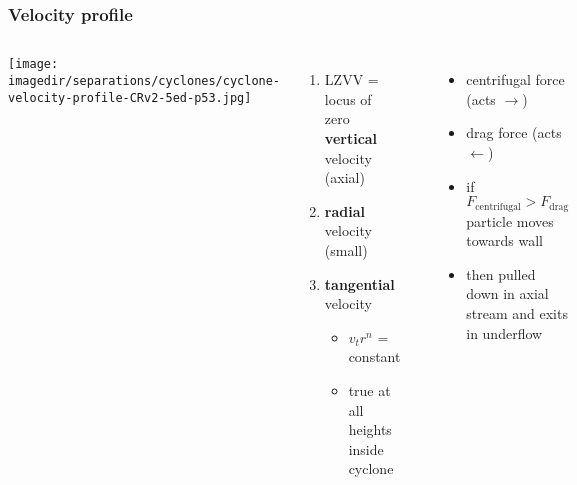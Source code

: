 \begin{frame}\frametitle{Velocity profile}
	\begin{columns}[c]
			\begin{center}
				\texttt{[image: \\imagedir/separations/cyclones/cyclone-velocity-profile-CRv2-5ed-p53.jpg]}
			\end{center}
			{}
			\begin{enumerate}
				\item	LZVV = locus of zero \textbf{vertical} velocity (axial)
				\item	\textbf{radial} velocity (small)
				\item	\textbf{tangential} velocity
					\begin{itemize}
						\item	$v_t r^n$ = constant
						\item	true at all heights inside cyclone 
					\end{itemize}
			\end{enumerate}
			\hrule
			\begin{itemize}
				\item	centrifugal force (acts $\longrightarrow$)
				\item	drag force (acts $\longleftarrow$)
				\item	if $F_\text{centrifugal} > F_\text{drag}$\\ particle moves towards wall
				\item	then pulled down in axial stream and exits in underflow
			\end{itemize}
	\end{columns}	
\end{frame}

